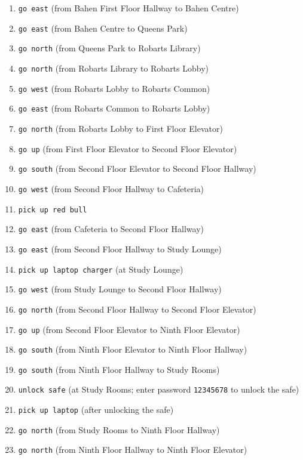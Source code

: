 \documentclass[11pt]{article}
\begin{document}
\begin{enumerate}
    \item \texttt{go east} \quad (from Bahen First Floor Hallway to Bahen Centre)
    \item \texttt{go east} \quad (from Bahen Centre to Queens Park)
    \item \texttt{go north} \quad (from Queens Park to Robarts Library)
    \item \texttt{go north} \quad (from Robarts Library to Robarts Lobby)
    \item \texttt{go west} \quad (from Robarts Lobby to Robarts Common)
    \item \texttt{go east} \quad (from Robarts Common to Robarts Lobby)
    \item \texttt{go north} \quad (from Robarts Lobby to First Floor Elevator)
    \item \texttt{go up} \quad (from First Floor Elevator to Second Floor Elevator)
    \item \texttt{go south} \quad (from Second Floor Elevator to Second Floor Hallway)
    \item \texttt{go west} \quad (from Second Floor Hallway to Cafeteria)
    \item \texttt{pick up red bull} 
    \item \texttt{go east} \quad (from Cafeteria to Second Floor Hallway)
    \item \texttt{go east} \quad (from Second Floor Hallway to Study Lounge)
    \item \texttt{pick up laptop charger} \quad (at Study Lounge)
    \item \texttt{go west} \quad (from Study Lounge to Second Floor Hallway)
    \item \texttt{go north} \quad (from Second Floor Hallway to Second Floor Elevator)
    \item \texttt{go up} \quad (from Second Floor Elevator to Ninth Floor Elevator)
    \item \texttt{go south} \quad (from Ninth Floor Elevator to Ninth Floor Hallway)
    \item \texttt{go south} \quad (from Ninth Floor Hallway to Study Rooms)
    \item \texttt{unlock safe} \quad (at Study Rooms; enter password \texttt{12345678} to unlock the safe)
    \item \texttt{pick up laptop} \quad (after unlocking the safe)
    \item \texttt{go north} \quad (from Study Rooms to Ninth Floor Hallway)
    \item \texttt{go north} \quad (from Ninth Floor Hallway to Ninth Floor Elevator)

\end{enumerate}
\end{document}
